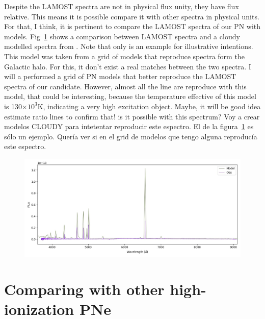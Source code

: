 \documentclass[twocolumn]{article}
\begin{document}
Despite the LAMOST spectra are not in physical flux unity, they have flux relative. This means it
is possible compare it with other spectra in physical units. For that, I think, it is pertinent to
compare the LAMOST spectra of our PN with models. Fig~\ref{fig:spectra-obs-model} shows a comparison
between LAMOST spectra and a {\sc cloudy} modelled spectra from \citet{Gutierrez-Soto:2020}.
Note that only is an example for illustrative intentions. This model was taken from a grid of
models that reproduce spectra form the Galactic halo. For this, it don't exist a real matches between
the two spectra. I will a performed a grid of PN models that better reproduce the LAMOST spectra of our candidate.
However, almost all the line are reproduce with this model, that could be interesting, because the
temperature effective of this model is 130$\times10^3$K, indicating a very high excitation object.
Maybe, it will be good idea estimate ratio lines to confirm that! is it possible with this spectrum?
{\cs Voy a crear modelos CLOUDY para intetentar reproducir este espectro. El de la figura~\ref{fig:spectra-obs-model}
  es sólo un ejemplo. Quería ver si en el grid de modelos que tengo alguna reproducía este espectro.}

\begin{figure}
\centering
  \includegraphics[width=0.89\linewidth]{../Spectra-lamostdr7/DdDm1_L4_T130_output_SED-E02-comparing-spectra}
  \caption{} 
  \label{fig:spectra-obs-model}
\end{figure}

\section{Comparing with other high-ionization PNe}
\label{sec:comp}
\end{document}
